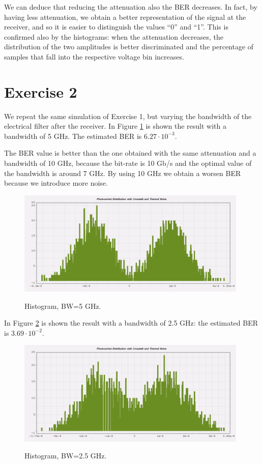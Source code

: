 \documentclass[a4paper,10pt]{report}
\begin{document}
We can deduce that reducing the attenuation also the BER decreases. In fact, by having less attenuation, we obtain a better
representation of the signal at the receiver, and so it is easier to distinguish the values ``0'' and ``1''. This is confirmed
also by the histograms: when the attenuation decreases, the distribution of the two amplitudes is better
discriminated and the percentage of samples that fall into the respective voltage bin increases.

\newpage
\section*{Exercise 2}
We repeat the same simulation of Exercise 1, but varying the bandwidth of the electrical filter after the receiver.
In Figure \ref{ex2_1} is shown the result with a bandwidth of 5 GHz. The estimated BER is $6.27 \cdot 10^{-3}$.

The BER value is better than the one obtained with the same attenuation and a bandwidth of 10 GHz, because the bit-rate is 10 Gb/s
and the optimal value of the bandwidth is around 7 GHz. By using 10 GHz we obtain a worsen BER because we introduce more noise.

\begin{figure}[!ht]
   \centering
   \includegraphics[width=11cm]{ex2_1.png}\\
   \caption{Histogram, BW=5 GHz.}
   \label{ex2_1}
\end{figure}

In Figure \ref{ex2_2} is shown the result with a bandwidth of 2.5 GHz: the estimated BER is $3.69 \cdot 10^{-2}$.

\begin{figure}[!ht]
   \centering
   \includegraphics[width=11cm]{ex2_2.png}\\
   \caption{Histogram, BW=2.5 GHz.}
   \label{ex2_2}
\end{figure}
\end{document}
